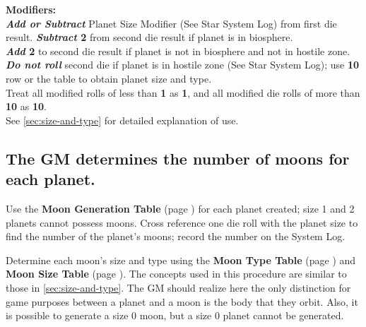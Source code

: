 \begin{table}[htbp]
{\begin{minipage}{5.5in}
{        \textbf{Modifiers:}\\
        \textbf{\emph{Add or Subtract}} Planet Size Modifier (See Star System
        Log) from first die result. \textbf{\emph{Subtract} 2} from second  
        die result if planet is in biosphere. \\
        \textbf{\emph{Add} 2} to second die result if planet is not in
        biosphere and not in hostile zone.\\
        \textbf{\emph{Do not roll}} second die if planet is in hostile zone
        (See Star System Log); use \textbf{10} row or the table to obtain 
        planet size and type.\\
        Treat all modified rolls of less than \textbf{1} as \textbf{1}, and
        all modified die rolls of more than \textbf{10} as \textbf{10}.\\
        See \ref{sec:size-and-type} for detailed explanation of use.}
    \end{minipage}}
\end{table}

\subsection[Moons]{The GM determines the number of moons for each
  planet.}
\label{sec:moons}

Use the \textbf{Moon Generation Table} (page \pageref{tab:moon-gen}) for
each planet created; size 1 and 2 planets cannot possess moons. Cross
reference one die roll with the planet size to find the number of the
planet's moons; record the number on the System Log.

Determine each moon's size and type using the \textbf{Moon Type Table}
(page \pageref{tab:moon-type}) and \textbf{Moon Size Table} (page
\pageref{tab:moon-size}). The concepts used in this procedure are similar
to those in \ref{sec:size-and-type}. The GM should realize here the
only distinction for game purposes between a planet and a moon is the
body that they orbit. Also, it is possible to generate a size 0
moon, but a size 0 planet cannot be generated.

